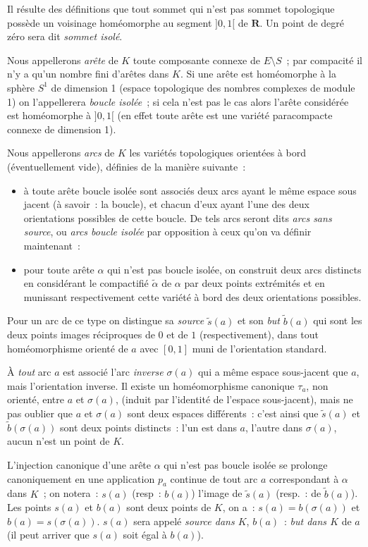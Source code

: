 Il résulte des définitions que tout sommet qui n'est pas sommet topologique possède un voisinage homéomorphe au segment $]0,1[$ de $\mathbf{R}$. Un point de degré zéro sera dit \emph{sommet isolé}. 

Nous appellerons \emph{arête} de $K$ toute composante connexe de $E \setminus S$~; par compacité il n'y a qu'un nombre fini d'arêtes dans $K$. Si une arête est homéomorphe à la sphère $S^1$ de dimension 1 (espace topologique des nombres complexes de module 1) on l'appellerera \emph{boucle isolée}~; si cela n'est pas le cas alors l'arête considérée est homéomorphe à $]0,1[$ (en effet toute arête est une variété paracompacte connexe de dimension 1). 

Nous appellerons \emph{arcs} de $K$ les variétés topologiques orientées à bord (éventuellement vide), définies de la manière suivante~: 
\begin{itemize}
    \item[1$^\circ$)] à toute arête boucle isolée sont associés deux arcs ayant le même espace sous jacent (à savoir~: la boucle), et chacun d'eux ayant l'une des deux orientations possibles de cette boucle. De tels arcs seront dits \emph{arcs sans source}, ou \emph{arcs boucle isolée} par opposition à ceux qu'on va définir maintenant~:
    \item[2$^\circ$)] pour toute arête $\alpha$ qui n'est pas boucle isolée, on construit deux arcs distincts en considérant le compactifié $\tilde{\alpha}$ de $\alpha$ par deux points extrémités et en munissant respectivement cette variété à bord des deux orientations possibles.
\end{itemize}
Pour un arc de ce type on distingue sa \emph{source} $\tilde{s}(a)$ et son \emph{but} $\tilde{b}(a)$ qui sont les deux points images réciproques de $0$ et de $1$ (respectivement), dans tout homéomorphisme orienté de $a$ avec $[0,1]$ muni de l'orientation standard. 

À \emph{tout} arc $a$ est associé l'arc \emph{inverse} $\sigma(a)$ qui a même espace sous-jacent que $a$, mais l'orientation inverse. Il existe un homéomorphisme canonique $\tau_a$, non orienté, entre $a$ et $\sigma(a)$, (induit par l'identité de l'espace sous-jacent), mais ne pas oublier que $a$ et $\sigma(a)$ sont deux espaces différents~: c'est ainsi que $\tilde{s}(a)$ et $\tilde{b}(\sigma(a))$ sont deux points distincts~: l'un est dans $a$, l'autre dans $\sigma(a)$, aucun n'est un point de $K$. 

L'injection canonique d'une arête $\alpha$ qui n'est pas boucle isolée se prolonge canoniquement en une application $p_a$ continue de tout arc $a$ correspondant à $\alpha$ dans $K$~; on notera~: $s(a)$ (resp~: $b(a)$) l'image de $\tilde{s}(a)$ (resp.~: de $\tilde{b}(a)$). Les points $s(a)$ et $b(a)$ sont deux points de $K$, on a~: $s(a) = b(\sigma(a))$ et $b(a) = s(\sigma(a))$. $s(a)$ sera appelé \emph{source dans $K$}, $b(a)$~: \emph{but dans $K$} de $a$ (il peut arriver que $s(a)$ soit égal à $b(a)$). 

